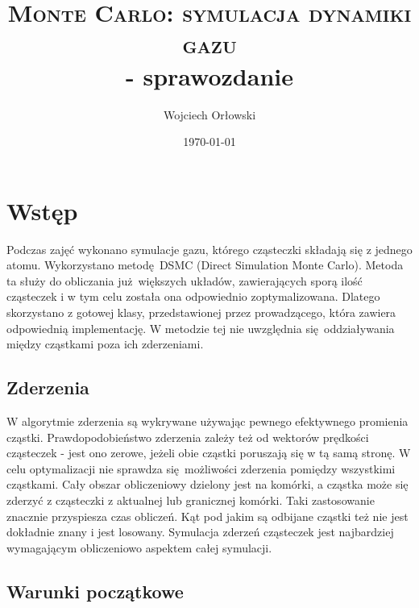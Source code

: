 \documentclass[a4paper, 12pt]{article}
\author{Wojciech Orłowski}
\date{\today}
\title{\textsc{Monte Carlo: symulacja dynamiki gazu}\\ - sprawozdanie}
\begin{document}
	\maketitle

	\section*{Wstęp}
	
	Podczas zajęć wykonano symulacje gazu, którego cząsteczki składają się z jednego atomu.
	Wykorzystano metodę DSMC (Direct Simulation Monte Carlo).
	Metoda ta służy do obliczania już większych układów, zawierających sporą ilość cząsteczek i w tym celu została ona odpowiednio zoptymalizowana.
	Dlatego skorzystano z gotowej klasy, przedstawionej przez prowadzącego, która zawiera odpowiednią implementację.
	W metodzie tej nie uwzględnia się oddziaływania między cząstkami poza ich zderzeniami.
	
	\subsection*{Zderzenia}
	
	W algorytmie zderzenia są wykrywane używając pewnego efektywnego promienia cząstki.
	Prawdopodobieństwo zderzenia zależy też od wektorów prędkości cząsteczek - jest ono zerowe, jeżeli obie cząstki poruszają się w tą samą stronę.
	W celu optymalizacji nie sprawdza się możliwości zderzenia pomiędzy wszystkimi cząstkami.
	Cały obszar obliczeniowy dzielony jest na komórki, a cząstka może się zderzyć z cząsteczki z aktualnej lub granicznej komórki.
	Taki zastosowanie znacznie przyspiesza czas obliczeń.
	Kąt pod jakim są odbijane cząstki też nie jest dokładnie znany i jest losowany.
	Symulacja zderzeń cząsteczek jest najbardziej wymagającym obliczeniowo aspektem całej symulacji.
	
	\subsection*{Warunki początkowe}
	
\end{document}
